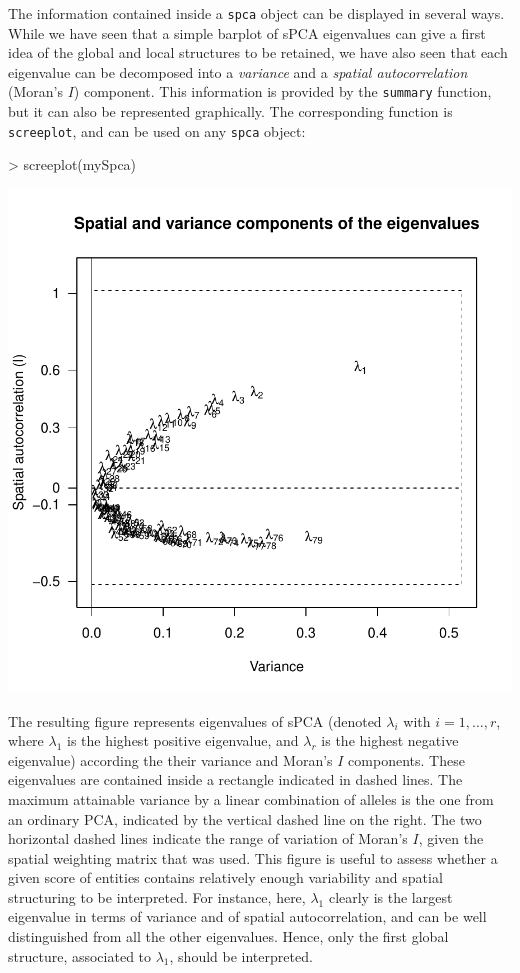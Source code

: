 \documentclass{article}
\begin{document}
The information contained inside a \texttt{spca} object can be displayed
in several ways.
While we have seen that a simple barplot of sPCA eigenvalues can give a first idea of the
global and local structures to be retained, we have also seen that
each eigenvalue can be decomposed into a \textit{variance} and a
\textit{spatial autocorrelation} (Moran's $I$) component.
This information is provided by the \texttt{summary} function, but it
can also be represented graphically.
The corresponding function is \texttt{screeplot}, and can be used on any
\texttt{spca} object:
\begin{Schunk}
\begin{Sinput}
> screeplot(mySpca)
\end{Sinput}
\end{Schunk}
\includegraphics{figs/spca-screeplot}

\noindent The resulting figure represents eigenvalues of sPCA (denoted
$\lambda_i$ with $i=1,\ldots,r$, where $\lambda_1$ is the highest
positive eigenvalue, and $\lambda_{r}$ is the highest negative
eigenvalue) according the their variance and Moran's $I$ components.
These eigenvalues are contained inside a rectangle indicated in dashed
lines.
The maximum attainable variance by a linear combination of alleles is
the one from an ordinary PCA, indicated by the vertical dashed line on
the right.
The two horizontal dashed lines indicate the range of variation of
Moran's $I$, given the spatial weighting matrix that was used.
This figure is useful to assess whether a given score of entities contains
relatively enough variability and spatial structuring to be interpreted.
For instance, here, $\lambda_1$ clearly is the largest eigenvalue in
terms of variance and of spatial autocorrelation, and can be well
distinguished from all the other eigenvalues.
Hence, only the first global structure, associated to $\lambda_1$, should be interpreted.
\\
\end{document}
